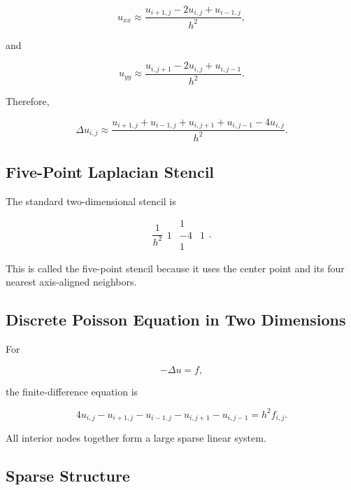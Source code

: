 \[
u_{xx}
\approx
\frac{
u_{i+1,j}
-
2u_{i,j}
+
u_{i-1,j}
}{
h^2
},
\]

and

\[
u_{yy}
\approx
\frac{
u_{i,j+1}
-
2u_{i,j}
+
u_{i,j-1}
}{
h^2
}.
\]

Therefore,

\[
\boxed{
\Delta u_{i,j}
\approx
\frac{
u_{i+1,j}
+
u_{i-1,j}
+
u_{i,j+1}
+
u_{i,j-1}
-
4u_{i,j}
}{
h^2
}.
}
\]

\subsection{Five-Point Laplacian Stencil}
\label{subsec:five-point-laplacian}

The standard two-dimensional stencil is

\[
\boxed{
\frac1{h^2}
\begin{array}{ccc}
&1&\\
1&-4&1\\
&1&
\end{array}.
}
\]

This is called the five-point stencil because it uses the center point and
its four nearest axis-aligned neighbors.

\subsection{Discrete Poisson Equation in Two Dimensions}
\label{subsec:discrete-poisson-2d}

For

\[
-\Delta u=f,
\]

the finite-difference equation is

\[
\boxed{
4u_{i,j}
-
u_{i+1,j}
-
u_{i-1,j}
-
u_{i,j+1}
-
u_{i,j-1}
=
h^2f_{i,j}.
}
\]

All interior nodes together form a large sparse linear system.

\subsection{Sparse Structure}
\label{subsec:pde-sparse-structure}

